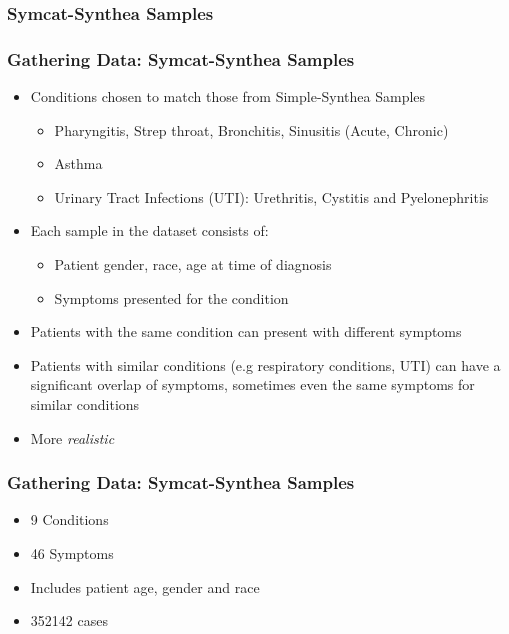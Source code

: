 \documentclass{beamer}
\begin{document}
	\subsubsection{Symcat-Synthea Samples}
	\begin{frame}
	\frametitle{Gathering Data: Symcat-Synthea Samples}
	\begin{itemize}
		\item Conditions chosen to match those from Simple-Synthea Samples
		\begin{itemize}
			\item Pharyngitis, Strep throat, Bronchitis, Sinusitis (Acute, Chronic)
			\item Asthma
			\item Urinary Tract Infections (UTI): Urethritis, Cystitis and Pyelonephritis
		\end{itemize}
		\item Each sample in the dataset consists of:
		\begin{itemize}
			\item Patient gender, race, age at time of diagnosis
			\item Symptoms presented for the condition
		\end{itemize}
		\item Patients with the same condition can present with different symptoms
		\item Patients with similar conditions (e.g respiratory conditions, UTI) can have a significant overlap of symptoms, sometimes even the same symptoms for similar conditions
		\item More \textit{realistic}
	\end{itemize}
	\end{frame}

	\begin{frame}
		\frametitle{Gathering Data: Symcat-Synthea Samples}
		\begin{itemize}
			\item 9 Conditions
			\item 46 Symptoms
			\item Includes patient age, gender and race
			\item 352142 cases
		\end{itemize}
	\end{frame}
\end{document}
